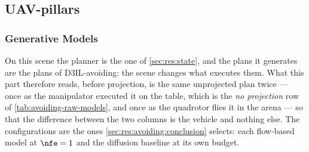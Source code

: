 \subsection{UAV-pillars}\label{sec:res:uav:pillars}

\subsubsection{Generative Models}\label{sec:res:uav:models}
On this scene the planner is the one of \autoref{sec:res:state}, and the plans it generates are the plans
of D3IL-avoiding: the scene changes what executes them. What this part therefore reads, before projection,
is the same unprojected plan twice --- once as the manipulator executed it on the table, which is the
\emph{no projection} row of \autoref{tab:avoiding-raw-models}, and once as the quadrotor flies it in the
arena --- so that the difference between the two columns is the vehicle and nothing else. The
configurations are the ones \autoref{sec:res:avoiding:conclusion} selects: each flow-based model at
$\nfe=1$ and the diffusion baseline at its own budget.

